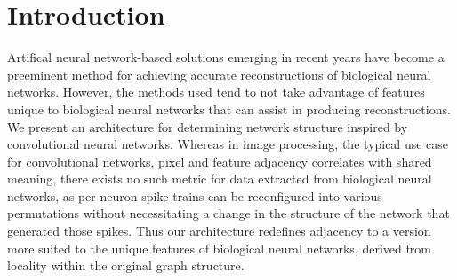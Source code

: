 
\chapter{Introduction}

Artifical neural network-based solutions emerging in recent years have become a 
preeminent method for achieving accurate reconstructions of biological neural 
networks.\cite{Ray2015} However, the methods used tend to not take advantage of 
features unique to biological neural networks that can assist in producing 
reconstructions.  We present an architecture for determining network structure 
inspired by convolutional neural networks.  Whereas in image processing, the 
typical use case for convolutional networks, pixel and feature adjacency 
correlates with shared meaning, there exists no such metric for data extracted 
from biological neural networks, as per-neuron spike trains can be reconfigured 
into various permutations without necessitating a change in the structure of the 
network that generated those spikes. Thus our architecture redefines adjacency 
to a version more suited to the unique features of biological neural networks, 
derived from locality within the original graph structure.
